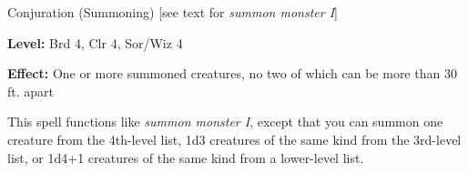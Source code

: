 
Conjuration (Summoning) [see text for \textit{summon monster I}]

\textbf{Level:} Brd 4, Clr 4, Sor/Wiz 4

\textbf{Effect:} One or more summoned creatures, no two of which can be more than 
30 ft. apart

This spell functions like \textit{summon monster I}, except that you can summon 
one creature from the 4th-level list, 1d3 creatures of the same kind from the 3rd-level 
list, or 1d4+1 creatures of the same kind from a lower-level list.


